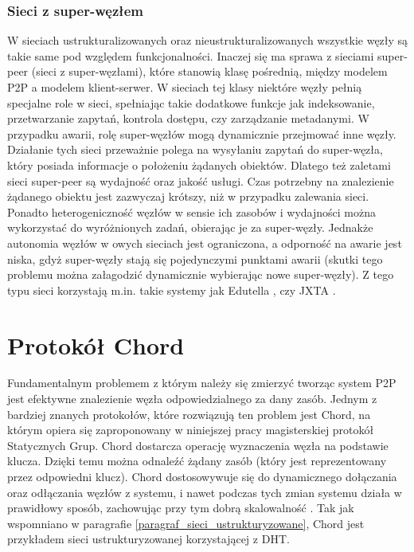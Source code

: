 \documentclass[12pt, twoside, openany]{report}
\begin{document}
\subsection{Sieci z super-węzłem}
W sieciach ustrukturalizowanych oraz nieustrukturalizowanych wszystkie węzły są takie same pod względem funkcjonalności. Inaczej się ma sprawa z sieciami super-peer (sieci z super-węzłami), które stanowią klasę pośrednią, między modelem P2P a modelem klient-serwer. W sieciach tej klasy niektóre węzły pełnią specjalne role w sieci, spełniając takie dodatkowe funkcje jak indeksowanie, przetwarzanie zapytań, kontrola dostępu, czy zarządzanie metadanymi. W przypadku awarii, rolę super-węzłów mogą dynamicznie przejmować inne węzły. Działanie tych sieci przeważnie polega na wysyłaniu zapytań do super-węzła, który posiada informacje o położeniu żądanych obiektów. Dlatego też zaletami sieci super-peer są wydajność oraz jakość usługi. Czas potrzebny na znalezienie żądanego obiektu jest zazwyczaj krótszy, niż w przypadku zalewania sieci. Ponadto heterogeniczność węzłów w sensie ich zasobów i wydajności można wykorzystać do wyróżnionych zadań, obierając je za super-węzły. Jednakże autonomia węzłów w owych sieciach jest ograniczona, a odporność na awarie jest niska, gdyż super-węzły stają się pojedynczymi punktami awarii (skutki tego problemu można załagodzić dynamicznie wybierając nowe super-węzły). Z tego typu sieci korzystają m.in. takie systemy jak Edutella \cite{bib:edutella}, czy JXTA \cite{bib:jxta}.


\chapter{Protokół Chord}
\label{rozdzial_chord}

Fundamentalnym problemem z którym należy się zmierzyć tworząc system P2P jest efektywne znalezienie węzła odpowiedzialnego za dany zasób. Jednym z bardziej znanych protokołów, które rozwiązują ten problem jest Chord, na którym opiera się zaproponowany w niniejszej pracy magisterskiej protokół Statycznych Grup. Chord dostarcza operację wyznaczenia węzła na podstawie klucza. Dzięki temu można odnaleźć żądany zasób (który jest reprezentowany przez odpowiedni klucz). Chord dostosowywuje się do dynamicznego dołączania oraz odłączania węzłów z systemu, i nawet podczas tych zmian systemu działa w prawidłowy sposób, zachowując przy tym dobrą skalowalność \cite{bib:chord}. Tak jak wspomniano w paragrafie \ref{paragraf_sieci_ustrukturyzowane}, Chord jest przykładem sieci ustrukturyzowanej korzystającej z DHT.
\end{document}

